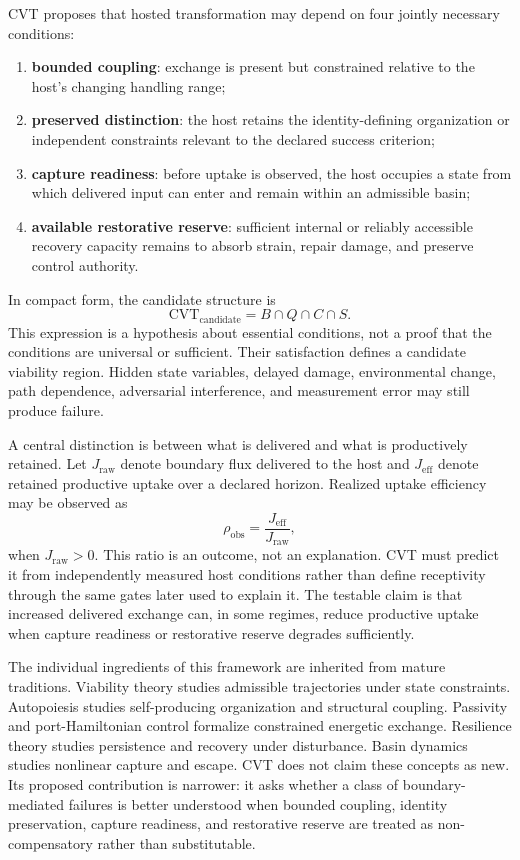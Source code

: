 CVT proposes that hosted transformation may depend on four jointly necessary conditions:
\begin{enumerate}[label=(\roman*)]
    \item \textbf{bounded coupling}: exchange is present but constrained relative to the host's changing handling range;
    \item \textbf{preserved distinction}: the host retains the identity-defining organization or independent constraints relevant to the declared success criterion;
    \item \textbf{capture readiness}: before uptake is observed, the host occupies a state from which delivered input can enter and remain within an admissible basin;
    \item \textbf{available restorative reserve}: sufficient internal or reliably accessible recovery capacity remains to absorb strain, repair damage, and preserve control authority.
\end{enumerate}

In compact form, the candidate structure is
\begin{equation}
    \mathrm{CVT}_{\mathrm{candidate}}
    =
    B\cap Q\cap C\cap S.
\end{equation}
This expression is a hypothesis about essential conditions, not a proof that the conditions are universal or sufficient. Their satisfaction defines a candidate viability region. Hidden state variables, delayed damage, environmental change, path dependence, adversarial interference, and measurement error may still produce failure.

A central distinction is between what is delivered and what is productively retained. Let \(J_{\mathrm{raw}}\) denote boundary flux delivered to the host and \(J_{\mathrm{eff}}\) denote retained productive uptake over a declared horizon. Realized uptake efficiency may be observed as
\begin{equation}
    \rho_{\mathrm{obs}}
    =
    \frac{J_{\mathrm{eff}}}{J_{\mathrm{raw}}},
\end{equation}
when \(J_{\mathrm{raw}}>0\). This ratio is an outcome, not an explanation. CVT must predict it from independently measured host conditions rather than define receptivity through the same gates later used to explain it. The testable claim is that increased delivered exchange can, in some regimes, reduce productive uptake when capture readiness or restorative reserve degrades sufficiently.

The individual ingredients of this framework are inherited from mature traditions. Viability theory studies admissible trajectories under state constraints. Autopoiesis studies self-producing organization and structural coupling. Passivity and port-Hamiltonian control formalize constrained energetic exchange. Resilience theory studies persistence and recovery under disturbance. Basin dynamics studies nonlinear capture and escape. CVT does not claim these concepts as new. Its proposed contribution is narrower: it asks whether a class of boundary-mediated failures is better understood when bounded coupling, identity preservation, capture readiness, and restorative reserve are treated as non-compensatory rather than substitutable.

